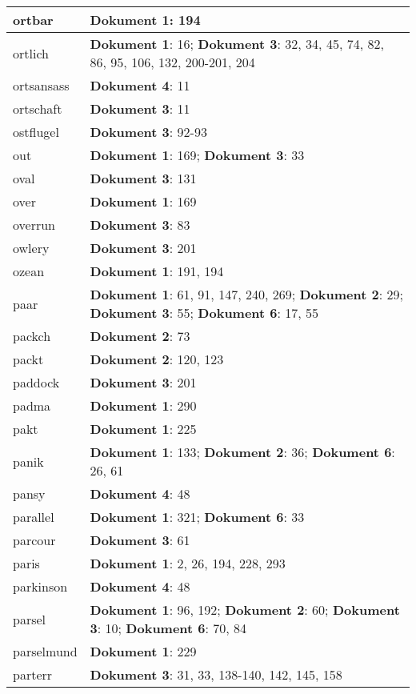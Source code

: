 \documentclass[a5paper]{article}
\begin{document}
\begin{longtable}[l]{|l|p{3in}|}
\hline
ortbar & \textbf{Dokument 1}: 194 \\
\hline
ortlich & \textbf{Dokument 1}: 16; \textbf{Dokument 3}: 32, 34, 45, 74, 82, 86, 95, 106, 132, 200-201, 204 \\
\hline
ortsansass & \textbf{Dokument 4}: 11 \\
\hline
ortschaft & \textbf{Dokument 3}: 11 \\
\hline
ostflugel & \textbf{Dokument 3}: 92-93 \\
\hline
out & \textbf{Dokument 1}: 169; \textbf{Dokument 3}: 33 \\
\hline
oval & \textbf{Dokument 3}: 131 \\
\hline
over & \textbf{Dokument 1}: 169 \\
\hline
overrun & \textbf{Dokument 3}: 83 \\
\hline
owlery & \textbf{Dokument 3}: 201 \\
\hline
ozean & \textbf{Dokument 1}: 191, 194 \\
\hline
paar & \textbf{Dokument 1}: 61, 91, 147, 240, 269; \textbf{Dokument 2}: 29; \textbf{Dokument 3}: 55; \textbf{Dokument 6}: 17, 55 \\
\hline
packch & \textbf{Dokument 2}: 73 \\
\hline
packt & \textbf{Dokument 2}: 120, 123 \\
\hline
paddock & \textbf{Dokument 3}: 201 \\
\hline
padma & \textbf{Dokument 1}: 290 \\
\hline
pakt & \textbf{Dokument 1}: 225 \\
\hline
panik & \textbf{Dokument 1}: 133; \textbf{Dokument 2}: 36; \textbf{Dokument 6}: 26, 61 \\
\hline
pansy & \textbf{Dokument 4}: 48 \\
\hline
parallel & \textbf{Dokument 1}: 321; \textbf{Dokument 6}: 33 \\
\hline
parcour & \textbf{Dokument 3}: 61 \\
\hline
paris & \textbf{Dokument 1}: 2, 26, 194, 228, 293 \\
\hline
parkinson & \textbf{Dokument 4}: 48 \\
\hline
parsel & \textbf{Dokument 1}: 96, 192; \textbf{Dokument 2}: 60; \textbf{Dokument 3}: 10; \textbf{Dokument 6}: 70, 84 \\
\hline
parselmund & \textbf{Dokument 1}: 229 \\
\hline
parterr & \textbf{Dokument 3}: 31, 33, 138-140, 142, 145, 158 \\
\hline

\end{longtable}
\end{document}

